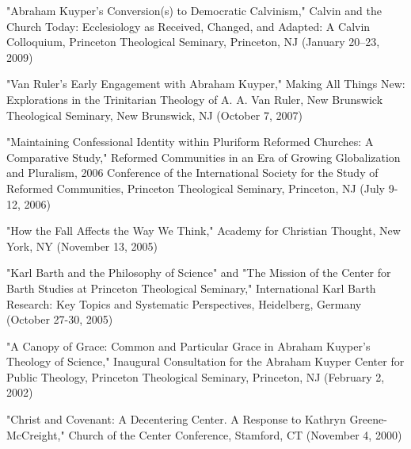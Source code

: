 \documentclass[10pt]{res} %
\begin{document}
\begin{resume}
\begin{hangparas}{.25in}{1}"Abraham Kuyper’s Conversion(s) to Democratic Calvinism," Calvin and the Church Today: Ecclesiology as Received, Changed, and Adapted: A Calvin Colloquium, Princeton Theological Seminary, Princeton, NJ (January 20–23, 2009)\end{hangparas}

\begin{hangparas}{.25in}{1}"Van Ruler’s Early Engagement with Abraham Kuyper," Making All Things New: Explorations in the Trinitarian Theology of A. A. Van Ruler, New Brunswick Theological Seminary, New Brunswick, NJ (October 7, 2007)\end{hangparas}

\begin{hangparas}{.25in}{1}"Maintaining Confessional Identity within Pluriform Reformed Churches: A Comparative Study," Reformed Communities in an Era of Growing Globalization and Pluralism, 2006 Conference of the International Society for the Study of Reformed Communities, Princeton Theological Seminary, Princeton, NJ (July 9-12, 2006)\end{hangparas}

\begin{hangparas}{.25in}{1}"How the Fall Affects the Way We Think," Academy for Christian Thought, New York, NY (November 13, 2005)\end{hangparas}

\begin{hangparas}{.25in}{1}"Karl Barth and the Philosophy of Science" and "The Mission of the Center for Barth Studies at Princeton Theological Seminary," International Karl Barth Research: Key Topics and Systematic Perspectives, Heidelberg, Germany (October 27-30, 2005)\end{hangparas}

\begin{hangparas}{.25in}{1}"A Canopy of Grace: Common and Particular Grace in Abraham Kuyper’s Theology of Science," Inaugural Consultation for the Abraham Kuyper Center for Public Theology, Princeton Theological Seminary, Princeton, NJ (February 2, 2002)\end{hangparas}

\begin{hangparas}{.25in}{1}"Christ and Covenant: A Decentering Center. A Response to Kathryn Greene-McCreight," Church of the Center Conference, Stamford, CT (November 4, 2000)\end{hangparas}


\end{resume}
\end{document}
